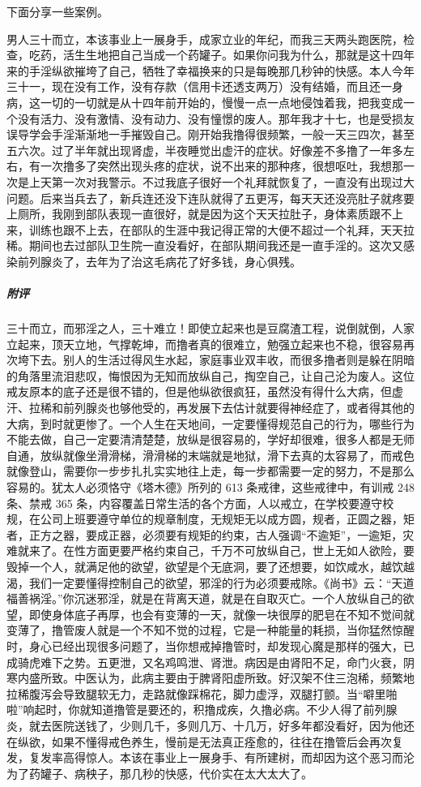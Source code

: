 下面分享一些案例。

\begin{case}
    男人三十而立，本该事业上一展身手，成家立业的年纪，而我三天两头跑医院，检查，吃药，活生生地把自己当成一个药罐子。如果你问我为什么，那就是这十四年来的手淫纵欲摧垮了自己，牺牲了幸福换来的只是每晚那几秒钟的快感。本人今年三十一，现在没有工作，没有存款（信用卡还透支两万）没有结婚，而且还一身病，这一切的一切就是从十四年前开始的，慢慢一点一点地侵蚀着我，把我变成一个没有活力、没有激情、没有动力、没有憧憬的废人。那年我才十七，也是受损友误导学会手淫渐渐地一手摧毁自己。刚开始我撸得很频繁，一般一天三四次，甚至五六次。过了半年就出现肾虚，半夜睡觉出虚汗的症状。好像差不多撸了一年多左右，有一次撸多了突然出现头疼的症状，说不出来的那种疼，很想呕吐，我想那一次是上天第一次对我警示。不过我底子很好一个礼拜就恢复了，一直没有出现过大问题。后来当兵去了，新兵连还没下连队就得了五更泻，每天天还没亮肚子就疼要上厕所，我刚到部队表现一直很好，就是因为这个天天拉肚子，身体素质跟不上来，训练也跟不上去，在部队的生涯中我记得正常的大便不超过一个礼拜，天天拉稀。期间也去过部队卫生院一直没看好，在部队期间我还是一直手淫的。这次又感染前列腺炎了，去年为了治这毛病花了好多钱，身心俱残。
    \subparagraph{附评} 三十而立，而邪淫之人，三十难立！即使立起来也是豆腐渣工程，说倒就倒，人家立起来，顶天立地，气撑乾坤，而撸者真的很难立，勉强立起来也不稳，很容易再次垮下去。别人的生活过得风生水起，家庭事业双丰收，而很多撸者则是躲在阴暗的角落里流泪悲叹，悔恨因为无知而放纵自己，掏空自己，让自己沦为废人。这位戒友原本的底子还是很不错的，但是他纵欲很疯狂，虽然没有得什么大病，但虚汗、拉稀和前列腺炎也够他受的，再发展下去估计就要得神经症了，或者得其他的大病，到时就更惨了。一个人生在天地间，一定要懂得规范自己的行为，哪些行为不能去做，自己一定要清清楚楚，放纵是很容易的，学好却很难，很多人都是无师自通，放纵就像坐滑滑梯，滑滑梯的末端就是地狱，滑下去真的太容易了，而戒色就像登山，需要你一步步扎扎实实地往上走，每一步都需要一定的努力，不是那么容易的。犹太人必须恪守《塔木德》所列的 613 条戒律，这些戒律中，有训戒 248 条、禁戒 365 条，内容覆盖日常生活的各个方面，人以戒立，在学校要遵守校规，在公司上班要遵守单位的规章制度，无规矩无以成方圆，规者，正圆之器，矩者，正方之器，要成正器，必须要有规矩的约束，古人强调“不逾矩”，一逾矩，灾难就来了。在性方面更要严格约束自己，千万不可放纵自己，世上无如人欲险，要毁掉一个人，就满足他的欲望，欲望是个无底洞，要了还想要，如饮咸水，越饮越渴，我们一定要懂得控制自己的欲望，邪淫的行为必须要戒除。《尚书》云：“天道福善祸淫。”你沉迷邪淫，就是在背离天道，就是在自取灭亡。一个人放纵自己的欲望，即使身体底子再厚，也会有变薄的一天，就像一块很厚的肥皂在不知不觉间就变薄了，撸管废人就是一个不知不觉的过程，它是一种能量的耗损，当你猛然惊醒时，身心已经出现很多问题了，当你想戒掉撸管时，却发现心魔是那样的强大，已成骑虎难下之势。五更泄，又名鸡鸣泄、肾泄。病因是由肾阳不足，命门火衰，阴寒内盛所致。中医认为，此病主要由于脾肾阳虚所致。好汉架不住三泡稀，频繁地拉稀腹泻会导致腿软无力，走路就像踩棉花，脚力虚浮，双腿打颤。当“噼里啪啦”响起时，你就知道撸管是要还的，积撸成疾，久撸必病。不少人得了前列腺炎，就去医院送钱了，少则几千，多则几万、十几万，好多年都没看好，因为他还在纵欲，如果不懂得戒色养生，慢前是无法真正痊愈的，往往在撸管后会再次复发，复发率高得惊人。本该在事业上一展身手、有所建树，而却因为这个恶习而沦为了药罐子、病秧子，那几秒的快感，代价实在太大太大了。
\end{case}

